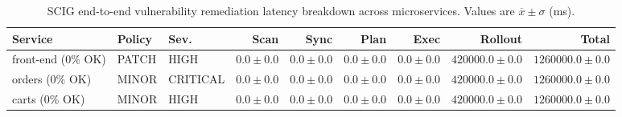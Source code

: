 \begin{table}[htbp]
\centering
\caption{SCIG end-to-end vulnerability remediation latency breakdown across microservices. Values are $\overline{x} \pm \sigma$ (ms).}
\label{tab:scig_s2_remediation}
\begin{tabular}{lllrrrrrr}
\toprule
\textbf{Service} & \textbf{Policy} & \textbf{Sev.} & \textbf{Scan} & \textbf{Sync} & \textbf{Plan} & \textbf{Exec} & \textbf{Rollout} & \textbf{Total} \\
\midrule
front-end (0\% OK) & PATCH & HIGH & $0.0 \pm 0.0$ & $0.0 \pm 0.0$ & $0.0 \pm 0.0$ & $0.0 \pm 0.0$ & $420000.0 \pm 0.0$ & $1260000.0 \pm 0.0$ \\
orders (0\% OK) & MINOR & CRITICAL & $0.0 \pm 0.0$ & $0.0 \pm 0.0$ & $0.0 \pm 0.0$ & $0.0 \pm 0.0$ & $420000.0 \pm 0.0$ & $1260000.0 \pm 0.0$ \\
carts (0\% OK) & MINOR & HIGH & $0.0 \pm 0.0$ & $0.0 \pm 0.0$ & $0.0 \pm 0.0$ & $0.0 \pm 0.0$ & $420000.0 \pm 0.0$ & $1260000.0 \pm 0.0$ \\
\bottomrule
\end{tabular}
\end{table}